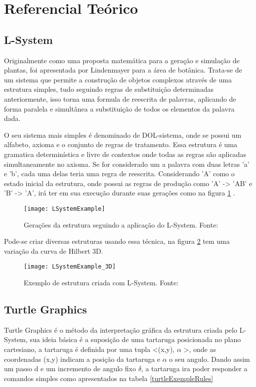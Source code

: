 \section{Referencial Teórico}

\subsection{L-System}
Originalmente como uma proposta matemática para a geração e simulação de plantas, foi apresentada por Lindenmayer\cite{Prusinkiewicz} para a área de botânica. Trata-se de um sistema que permite a construção de objetos complexos através de uma estrutura simples, tudo seguindo regras de substituição determinadas anteriormente, isso torna uma formula de reescrita de palavras, aplicando de forma paralela e simultânea a substituição de todos os elementos da palavra dada. 

O seu sistema mais simples é denominado de DOL-sistema, onde se possui um alfabeto, axioma e o conjunto de regras de tratamento. Essa estrutura é uma gramatica determinística e livre de contextos onde todas as regras são aplicadas simultaneamente no axioma. Se for considerado um	a palavra com duas letras 'a' e 'b', cada uma delas teria uma regra de reescrita. Considerando 'A' como o estado inicial da estrutura, onde possui as regras de produção como 'A' -> 'AB' e 'B' -> 'A', irá ter em sua execução durante suas gerações como na figura \ref{LSystemGenerationExemple} .

\begin{figure}[!h]
	\centering
	\texttt{[image: LSystemExample]}
	\caption{Gerações da estrutura seguindo a aplicação do L-System. Fonte: \cite{natureCode}}
	\label{LSystemGenerationExemple}
\end{figure}

Pode-se criar diversas estruturas usando essa técnica, na figura \ref{LSystemStructureExample3D} tem uma variação da curva de Hilbert 3D.

\begin{figure}[!h]
	\centering
	\texttt{[image: LSystemExample\_3D]}
	\caption{Exemplo de estrutura criada com L-System. Fonte: \cite{fridenfalk2015application}}
	\label{LSystemStructureExample3D}
\end{figure}

\subsection{Turtle Graphics} 
Turtle Graphics\cite{Abelson} é o método da interpretação gráfica da estrutura criada pelo L-System, sua ideia básica é a suposição de uma tartaruga posicionada no plano cartesiano, a tartaruga é definida por uma tupla <(x,y), $\alpha$ >, onde as coordenadas (x,y) indicam a posição da tartaruga e $\alpha$ o seu angulo.
Dando assim um passo d e um incremento de angulo fixo $\delta$, a tartaruga ira poder responder a comandos simples como apresentados na tabela \ref{turtleExempleRules}

